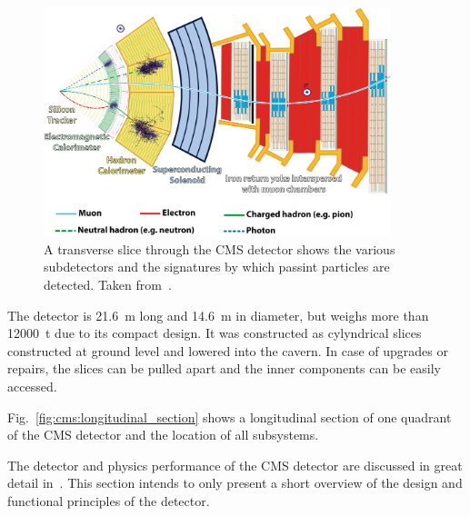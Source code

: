 \begin{figure}[htp]
    \centering
    \includegraphics[width=0.9\textwidth]{figures/cms_detector/cms_slice.png}
    \caption[Transverse slice of the CMS detector]{A transverse slice through the
        CMS detector shows the various subdetectors and the signatures by which
        passint particles are detected. Taken from~\cite{Barney:2120661}.}
    \label{fig:cms:transverse_slice}
\end{figure}

The detector is \SI{21.6}{\meter} long and \SI{14.6}{\meter} in diameter, but
weighs more than \SI{12000}{\tonne} due to its compact design. It was
constructed as cylyndrical slices constructed at ground level and lowered into
the cavern. In case of upgrades or repairs, the slices can be pulled apart and
the inner components can be easily accessed.

Fig.~\ref{fig:cms:longitudinal_section} shows a longitudinal section of one
quadrant of the CMS detector and the location of all subsystems.

The detector and physics performance of the CMS detector are discussed in great
detail in~\cite{Bayatian:922757,Ball:2007zza,Chatrchyan:2008aa}. This section
intends to only present a short overview of the design and functional principles
of the detector.

